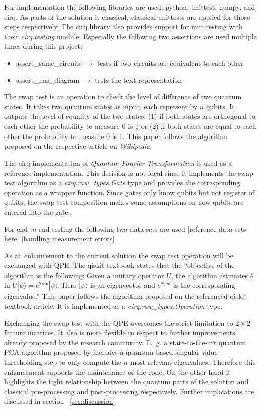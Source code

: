 For implementation the following libraries are used: python, unittest, numpy, and cirq. As parts of the solution is classical, classical unittests are applied for those steps respectively. The cirq library also provides support for unit testing with their \emph{cirq.testing} module. Especially the following two assertions are used multiple times during this project:
\begin{itemize}
  \item assert\_same\_circuits $\rightarrow$ tests if two circuits are equivalent to each other
  \item assert\_has\_diagram $\rightarrow$ tests the text representation
\end{itemize}

The swap test is an operation to check the level of difference of two quantum states. It takes two quantum states as input, each represent by $n$ qubits. It outputs the level of equality of the two states: (1) if both states are orthogonal to each other the probability to measure $0$ is $\frac{1}{2}$ or (2) if both states are equal to each other the probability to measure $0$ is $1$. This paper follows the algorithm proposed on the respective article on \emph{Wikipedia}.\cite{Wp_Swap}

The cirq implementation of \emph{Quantum Fourier Transformation} \cite{Cirq_Qft} is used as a reference implementation. This decision is not ideal since it implements the swap test algorithm as a \emph{cirq.raw\_types.Gate} type and provides the corresponding operation as a wrapper function. Since gates only know qubits but not register of qubits, the swap test composition makes some assumptions on how qubits are entered into the gate.

For end-to-end testing the following two data sets are used [reference data sets here] [handling measurement errors]

As an enhancement to the current solution the swap test operation will be exchanged with QPE. The qiskit textbook states that the \enquote{objective of the algorithm is the following: Given a unitary operator $U$, the algorithm estimates $\theta$ in $U|\psi\rangle = e^{2\pi i\theta}|\psi\rangle$. Here $|\psi\rangle$ is an eigenvector and $e^{2\psi i\theta}$ is the corresponding eigenvalue.}\cite{Qtb_Qpe} This paper follows the algorithm proposed on the referenced qiskit textbook article. It is implemented as a \emph{cirq.raw\_types.Operation} type.

Exchanging the swap test with the QPE overcomes the strict limitation to $2 \times 2$ feature matrices. It also is more flexible in respect to further improvements already proposed by the research community. E.~g. a state-to-the-art quantum PCA algorithm proposed by \cite{He_2021} includes a quantum based singular value thresholding step to only compute the $n$ most relevant eigenvalues. Therefore this enhancement supports the maintenance of the code. On the other hand it highlights the tight relationship between the quantum parts of the solution and classical pre-processing and post-processing respectively. Further implications are discussed in section ~\ref{sec:discussion}.
